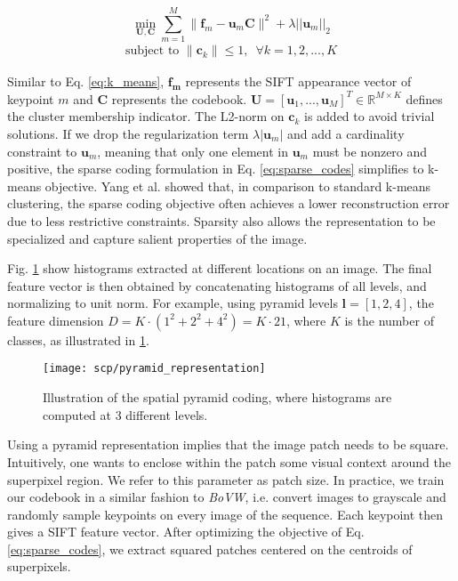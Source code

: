 \begin{equation}
  \min_{\boldsymbol{U,C}} \sum_{m=1}^M \|\boldsymbol{f}_m - \boldsymbol{u}_m \boldsymbol{C}\|^2 + \lambda ||\boldsymbol{u}_m||_{2}
  \label{eq:sparse_codes} 
\end{equation}
\begin{align*}
  \textrm{subject to } \|\boldsymbol{c}_k\| \leq 1, \hspace{6pt} \forall{k} = 1,2,...,K
\end{align*}

Similar to Eq. \ref{eq:k_means}, $\boldsymbol{f_m}$ represents the SIFT appearance vector of keypoint $m$ and $\boldsymbol{C}$ represents the codebook.
$\boldsymbol{U} = [\boldsymbol{u}_1,...,\boldsymbol{u}_M]^T \in \mathbb{R}^{M \times K}$ defines the cluster membership indicator.
The L2-norm on $\boldsymbol{c}_k$ is added to avoid trivial solutions.
If we drop the regularization term $\lambda |\boldsymbol{u}_m|$ and add a cardinality constraint to $\boldsymbol{u}_m$, meaning that only one element in $\boldsymbol{u}_m$ must be nonzero and positive, the sparse coding formulation in Eq. \ref{eq:sparse_codes} simplifies to k-means objective.
Yang et al. \cite{yang09} showed that, in comparison to standard k-means clustering, the sparse coding objective often achieves a lower reconstruction error due to less restrictive constraints.
Sparsity also allows the representation to be specialized and capture salient properties of the image.

Fig. \ref{fig:pyramid_repr} show histograms extracted at different locations on an image.
The final feature vector is then obtained by concatenating histograms of all levels, and normalizing to unit norm.
For example, using pyramid levels $\boldsymbol{l} = [1,2,4]$, the feature dimension $D = K \cdot (1^2 + 2^2 + 4^2) = K \cdot 21$, where $K$ is the number of classes, as illustrated in \ref{fig:pyramid_repr}.

\begin{figure}[htbp]
  \centering
  \texttt{[image: scp/pyramid\_representation]}
  \caption[Spatial pyramid representation]{Illustration of the spatial pyramid coding, where histograms are computed at 3 different levels.}
  \label{fig:pyramid_repr}
\end{figure}

Using a pyramid representation implies that the image patch needs to be square. Intuitively, one wants to enclose within the patch some visual context around the superpixel region.
We refer to this parameter as patch size.
In practice, we train our codebook in a similar fashion to \textit{BoVW}, i.e. convert images to grayscale and randomly sample keypoints on every image of the sequence.
Each keypoint then gives a SIFT feature vector.
After optimizing the objective of Eq. \ref{eq:sparse_codes}, we extract squared patches centered on the centroids of superpixels.

